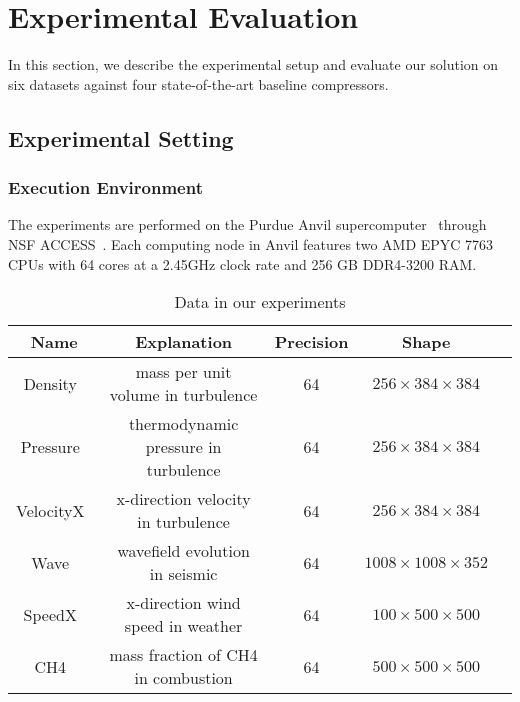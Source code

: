 \section{Experimental Evaluation}
\label{sec:evaluation}
In this section, we describe the experimental setup and evaluate our solution on six datasets against four state-of-the-art baseline compressors.

\subsection{Experimental Setting}

\subsubsection{Execution Environment} The experiments are performed on the Purdue Anvil supercomputer~\cite{anvil} through NSF ACCESS~\cite{access}. Each computing node in Anvil features two AMD EPYC 7763 CPUs with 64 cores at a 2.45GHz clock rate and 256 GB DDR4-3200 RAM. 

\begin{table}[ht]

    \centering
    \caption{Data in our experiments}
    \vspace{-3mm}
    \begin{adjustbox}{width=\columnwidth}
    \begin{tabular}{|c|c|c|c|c|}
    \hline
Name & Explanation & Precision & Shape  \\ \hline
Density~\cite{sdrbench} & mass per unit volume in turbulence & 64 & $256\times384\times384$ \\ \hline
Pressure~\cite{sdrbench} & thermodynamic pressure in turbulence & 64 & $256\times384\times384$ \\ \hline
VelocityX~\cite{sdrbench} & x-direction velocity in turbulence & 64 & $256\times384\times384$ \\ \hline
Wave~\cite{interp} & wavefield evolution in seismic & 64 & $1008\times1008\times352$ \\ \hline
SpeedX~\cite{sdrbench} & x-direction wind speed in weather  & 64 & $100\times500\times500$ \\ \hline
CH4~\cite{sdrbench} & mass fraction of CH4  in combustion & 64 & $500\times500\times500$ \\ \hline
\end{tabular}
\end{adjustbox}
\label{tab:apps}
\vspace{-3mm}

\end{table}

